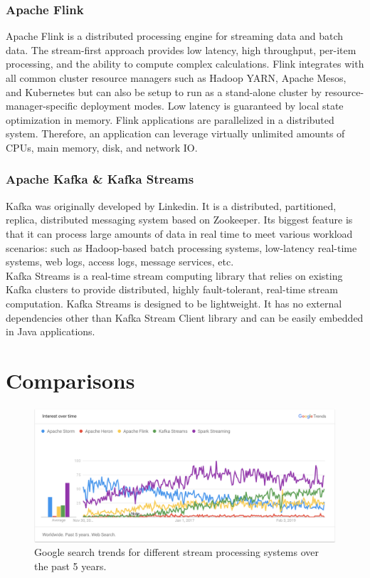 \documentclass[pdftex,twocolumn,10pt,letterpaper]{article}
\begin{document}
\subsubsection{Apache Flink}

Apache Flink is a distributed processing engine for streaming data and batch data. The stream-first approach provides low latency, high throughput, per-item processing, and the ability to compute complex calculations. Flink integrates with all common cluster resource managers such as Hadoop YARN\cite{vavilapalli2013apache}, Apache Mesos\cite{hindman2011mesos}, and Kubernetes\cite{burns2016borg} but can also be setup to run as a stand-alone cluster by resource-manager-specific deployment modes. Low latency is guaranteed by local state optimization in memory. Flink applications are parallelized in a distributed system. Therefore, an application can leverage virtually unlimited amounts of CPUs, main memory, disk, and network IO. 

\subsubsection{Apache Kafka \& Kafka Streams}

Kafka\cite{kreps2011kafka} was originally developed by Linkedin. It is a distributed, partitioned, replica, distributed messaging system based on Zookeeper. Its biggest feature is that it can process large amounts of data in real time to meet various workload scenarios: such as Hadoop-based batch processing systems, low-latency real-time systems, web logs, access logs, message services, etc. \\

Kafka Streams is a real-time stream computing library that relies on existing Kafka clusters to provide distributed, highly fault-tolerant, real-time stream computation. Kafka Streams is designed to be lightweight. It has no external dependencies other than Kafka Stream Client library and can be easily embedded in Java applications. 

\section{Comparisons}

\begin{figure}[!ht]
    \centering
    \includegraphics[width=\textwidth]{trend.png}
    \caption{Google search trends\cite{googletrend} for different stream processing systems over the past 5 years.}
    \label{fig:trend}
\end{figure}
\end{document}
